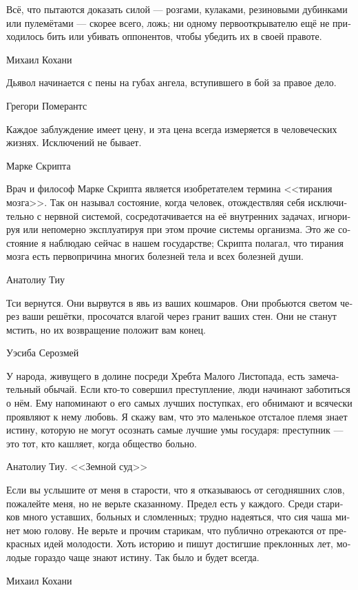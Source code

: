 \documentclass[a4paper,12pt,fleqn]{book}\usepackage{polyglossia}\setdefaultlanguage[babelshorthands=true]{russian}\setotherlanguage{english}\defaultfontfeatures{Ligatures=TeX,Mapping=tex-text}\usepackage{xcolor}\newcommand{\ml}[3]{#2}
\begin{document}
{\epigraph
{Всё, что пытаются доказать силой --- розгами, кулаками, резиновыми дубинками или пулемётами --- скорее всего, ложь;
ни одному первооткрывателю ещё не приходилось бить или убивать оппонентов, чтобы убедить их в своей правоте.}
{Михаил Кохани}

\epigraph
{Дьявол начинается с пены на губах ангела, вступившего в бой за правое дело.}
{Грегори Померантс}

\epigraph
{Каждое заблуждение имеет цену, и эта цена всегда измеряется в человеческих жизнях.
Исключений не бывает.}
{Марке Скрипта}

\epigraph
{Врач и философ Марке Скрипта является изобретателем термина <<тирания мозга>>.
Так он называл состояние, когда человек, отождествляя себя исключительно с нервной системой, сосредотачивается на её внутренних задачах, игнорируя или непомерно эксплуатируя при этом прочие системы организма.
Это же состояние я наблюдаю сейчас в нашем государстве;
Скрипта полагал, что тирания мозга есть первопричина многих болезней тела и всех болезней души.}
{Анатолиу Тиу}

\epigraph
{Тси вернутся.
Они вырвутся в явь из ваших кошмаров.
Они пробьются светом через ваши решётки, просочатся влагой через гранит ваших стен.
Они не станут мстить, но их возвращение положит вам конец.}
{Уэсиба Серозмей}

\epigraph
{У народа, живущего в долине посреди Хребта Малого Листопада, есть замечательный обычай.
Если кто-то совершил преступление, люди начинают заботиться о нём.
Ему напоминают о его самых лучших поступках, его обнимают и всячески проявляют к нему любовь.
Я скажу вам, что это маленькое отсталое племя знает истину, которую не могут осознать самые лучшие умы государя: преступник --- это тот, кто кашляет, когда общество больно.}
{Анатолиу Тиу.
<<Земной суд>>}

\epigraph
{Если вы услышите от меня в старости, что я отказываюсь от сегодняшних слов, пожалейте меня, но не верьте сказанному.
Предел есть у каждого.
Среди стариков много уставших, больных и сломленных;
трудно надеяться, что сия чаша минет мою голову.
Не верьте и прочим старикам, что публично отрекаются от прекрасных идей молодости.
Хоть историю и пишут достигшие преклонных лет, молодые гораздо чаще знают истину.
Так было и будет всегда.}
{Михаил Кохани}

}
\end{document}
